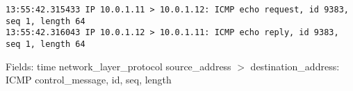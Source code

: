 \begin{lstlisting}
13:55:42.315433 IP 10.0.1.11 > 10.0.1.12: ICMP echo request, id 9383, seq 1, length 64
13:55:42.316043 IP 10.0.1.12 > 10.0.1.11: ICMP echo reply, id 9383, seq 1, length 64

\end{lstlisting}
Fields: time network\_layer\_protocol source\_address $>$ destination\_address: ICMP control\_message, id, seq, length
